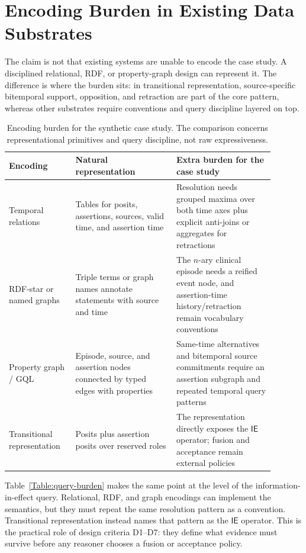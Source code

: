\documentclass[a4paper,fleqn]{cas-sc}
\newcommand{\ie}{\mathsf{IE}}
\theoremstyle{plain}
\theoremstyle{remark}
\begin{document}
\section{Encoding Burden in Existing Data Substrates}
\label{Sec:encodings}
The claim is not that existing systems are unable to encode the case study. A disciplined relational, RDF, or property-graph design can represent it. The difference is where the burden sits: in transitional representation, source-specific bitemporal support, opposition, and retraction are part of the core pattern, whereas other substrates require conventions and query discipline layered on top.

\begin{table}[t]
\centering
\small
\begin{tabular}{p{0.22\linewidth} p{0.34\linewidth} p{0.33\linewidth}}
\toprule
Encoding & Natural representation & Extra burden for the case study \\
\midrule
Temporal relations & Tables for posits, assertions, sources, valid time, and assertion time & Resolution needs grouped maxima over both time axes plus explicit anti-joins or aggregates for retractions \\
RDF-star or named graphs & Triple terms or graph names annotate statements with source and time & The \(n\)-ary clinical episode needs a reified event node, and assertion-time history/retraction remain vocabulary conventions \\
Property graph / GQL & Episode, source, and assertion nodes connected by typed edges with properties & Same-time alternatives and bitemporal source commitments require an assertion subgraph and repeated temporal query patterns \\
Transitional representation & Posits plus assertion posits over reserved roles & The representation directly exposes the \(\ie\) operator; fusion and acceptance remain external policies \\
\bottomrule
\end{tabular}
\caption{Encoding burden for the synthetic case study. The comparison concerns representational primitives and query discipline, not raw expressiveness.}
\label{Table:encodings}
\end{table}

Table~\ref{Table:query-burden} makes the same point at the level of the information-in-effect query. Relational, RDF, and graph encodings can implement the semantics, but they must repeat the same resolution pattern as a convention. Transitional representation instead names that pattern as the \(\ie\) operator. This is the practical role of design criteria D1--D7: they define what evidence must survive before any reasoner chooses a fusion or acceptance policy.
\end{document}
